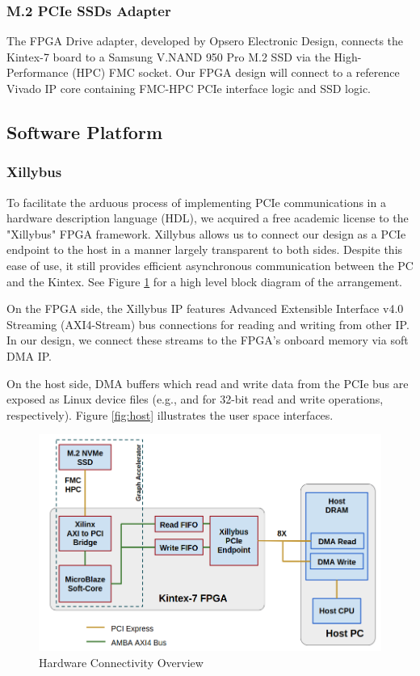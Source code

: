 \subsubsection{M.2 PCIe SSDs Adapter}
The FPGA Drive adapter, developed by Opsero Electronic Design, connects the Kintex-7 board to a Samsung V.NAND 950 Pro M.2 SSD via the High-Performance (HPC) FMC socket.  Our FPGA design will connect to a reference Vivado IP core containing FMC-HPC PCIe interface logic and SSD logic.

\subsection{Software Platform}

\subsubsection{Xillybus}
To facilitate the arduous process of implementing PCIe communications in a hardware description language (HDL), we acquired a free academic license to the "Xillybus" FPGA framework.  Xillybus allows us to connect our design as a PCIe endpoint to the host in a manner largely transparent to both sides.  Despite this ease of use, it still provides efficient asynchronous communication between the PC and the Kintex.  See Figure \ref{fig:hardware} for a high level block diagram of the arrangement.

On the FPGA side, the Xillybus IP features Advanced Extensible Interface v4.0 Streaming (AXI4-Stream) bus connections for reading and writing from other IP.  In our design, we connect these streams to the FPGA's onboard memory via soft DMA IP.

On the host side, DMA buffers which read and write data from the PCIe bus are exposed as Linux device files (e.g., \emph{} and \emph{} for 32-bit read and write operations, respectively).  Figure \ref{fig:host} illustrates the user space interfaces.

\begin{figure}[h]
  \includegraphics[scale = 0.4]{pic/HardwareConn.png}
  \caption{Hardware Connectivity Overview}
  \label{fig:hardware}
\end{figure}

